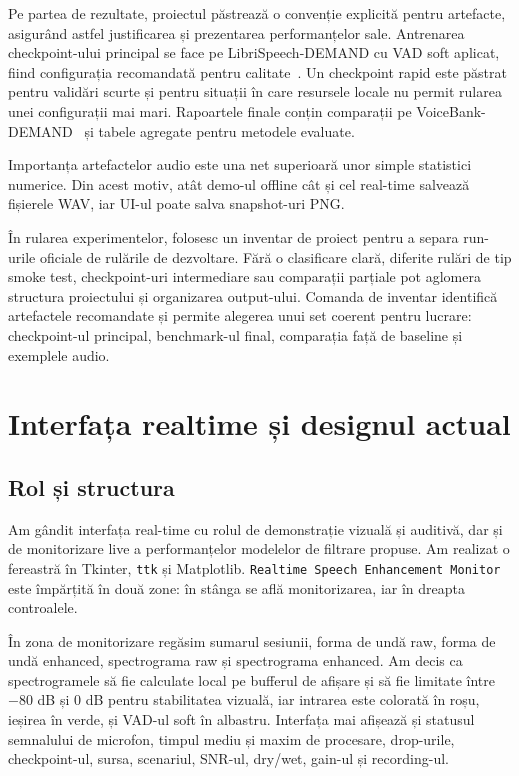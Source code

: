 \documentclass[12pt,a4paper]{report}
\begin{document}
Pe partea de rezultate, proiectul păstrează o convenție explicită pentru artefacte, 
asigurând astfel justificarea și prezentarea performanțelor sale. 
Antrenarea checkpoint-ului principal se face pe LibriSpeech-DEMAND 
cu VAD soft aplicat, fiind configurația recomandată pentru calitate~\cite{librispeech,demand}. 
Un checkpoint rapid este păstrat pentru validări scurte și pentru 
situații în care resursele locale nu permit rularea unei configurații 
mai mari. Rapoartele finale conțin comparații pe VoiceBank-DEMAND~\cite{voicebank_demand} și 
tabele agregate pentru metodele evaluate.

Importanța artefactelor audio este una net superioară unor simple 
statistici numerice. Din acest motiv, atât demo-ul offline cât și cel 
real-time salvează fișierele WAV, iar UI-ul poate salva snapshot-uri 
PNG.

În rularea experimentelor, folosesc un inventar de proiect pentru a 
separa run-urile oficiale de rulările de dezvoltare. Fără o 
clasificare clară, diferite rulări de tip smoke test, checkpoint-uri 
intermediare sau comparații parțiale pot aglomera structura 
proiectului și organizarea output-ului. Comanda de inventar 
identifică artefactele recomandate și permite alegerea unui set 
coerent pentru lucrare: checkpoint-ul principal, benchmark-ul final, 
comparația față de baseline și exemplele audio.

\chapter{Interfața realtime și designul actual}

\section{Rol și structura}

Am gândit interfața real-time cu rolul de demonstrație vizuală și 
auditivă, dar și de  monitorizare live a performanțelor modelelor de 
filtrare propuse. Am realizat o fereastră în Tkinter, \texttt{ttk} și Matplotlib.
\texttt{Realtime Speech Enhancement Monitor} este împărțită în două zone: în 
stânga se află monitorizarea, iar în dreapta controalele.

În zona de monitorizare regăsim sumarul sesiunii, forma de undă raw, 
forma de undă enhanced, spectrograma raw și spectrograma enhanced. 
Am decis ca spectrogramele să fie calculate local pe bufferul de 
afișare și să fie limitate între \(-80\) dB și \(0\) dB pentru stabilitatea 
vizuală, iar intrarea este colorată în roșu, ieșirea în verde, și 
VAD-ul soft în albastru. Interfața mai afișează și statusul semnalului 
de microfon, timpul mediu și maxim de procesare, drop-urile, checkpoint-ul, 
sursa, scenariul, SNR-ul, dry/wet, gain-ul și recording-ul.
\end{document}
